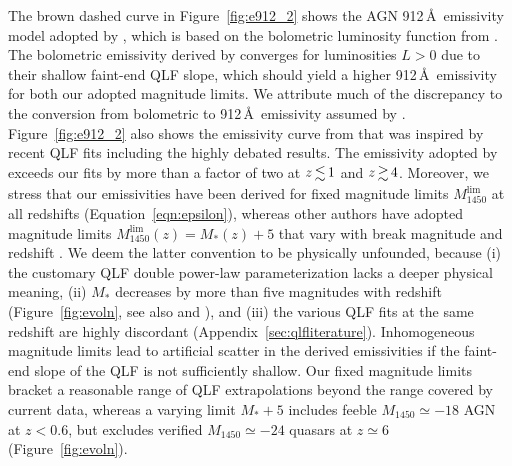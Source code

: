 \documentclass[fleqn,usenatbib]{mnras}
\begin{document}
The brown dashed curve in Figure~\ref{fig:e912_2} shows the AGN 912\,\AA\ emissivity model adopted by
\citet{2012ApJ...746..125H}, which is based on the bolometric luminosity function from \citet{2007ApJ...654..731H}.
The bolometric emissivity derived by \citet{2007ApJ...654..731H} converges for luminosities $L>0$
due to their shallow faint-end QLF slope, which should yield a higher 912\,\AA\ emissivity for
both our adopted magnitude limits. We attribute much of the discrepancy to the conversion from bolometric
to 912\,\AA\ emissivity assumed by \citet{2007ApJ...654..731H}.
Figure~\ref{fig:e912_2} also shows the emissivity curve from \citet{2015ApJ...813L...8M}
that was inspired by recent QLF fits including the highly debated \citet{2015AA...578A..83G} results.
The emissivity adopted by \citet{2015ApJ...813L...8M} exceeds our fits by more than a factor of two
at $z\la 1$ and $z\ga 4$. Moreover, we stress that our emissivities have been derived for fixed magnitude
limits $M_{1450}^\mathrm{lim}$ at all redshifts (Equation~\eqref{eqn:epsilon}), whereas other authors have
adopted magnitude limits $M_{1450}^\mathrm{lim}\left(z\right)=M_*\left(z\right)+5$ that vary with break
magnitude and redshift \citep{2015AA...578A..83G,2015ApJ...813L...8M,2015MNRAS.451L..30K,2018arXiv180104931P}.
We deem the latter convention to be physically unfounded, because (i) the customary QLF double power-law
parameterization lacks a deeper physical meaning, (ii) $M_*$ decreases by more than five magnitudes
with redshift (Figure~\ref{fig:evoln}, see also \citealt{2013ApJ...768..105M} and \citealt{2016ApJ...829...33Y}),
and (iii) the various QLF fits at the same redshift are highly discordant (Appendix~\ref{sec:qlfliterature}).
Inhomogeneous magnitude limits lead to artificial scatter in the derived emissivities if the faint-end slope of
the QLF is not sufficiently shallow. Our fixed magnitude limits bracket a reasonable range of QLF extrapolations
beyond the range covered by current data, whereas a varying limit $M_*+5$ includes feeble
$M_{1450}\simeq -18$ AGN at $z<0.6$, but excludes verified $M_{1450}\simeq -24$ quasars at $z\simeq 6$ (Figure~\ref{fig:evoln}).
\end{document}
